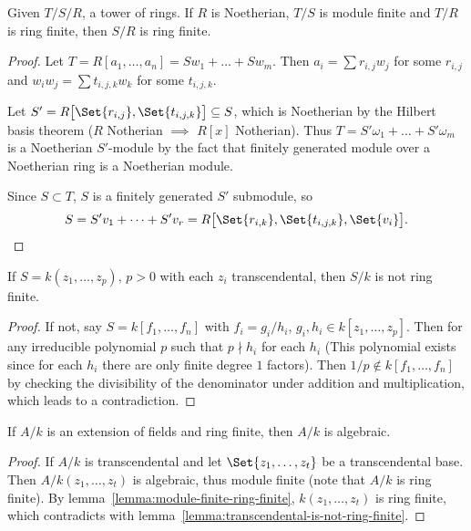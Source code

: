 \begin{lemma} \label{lemma:module-finite-ring-finite}
  Given $T/S/R$, a tower of rings.
  If $R$ is Noetherian, $T/S$ is module finite and $T/R$ is ring finite, then
  $S/R$ is ring finite.

  \begin{proof}
    Let $T = R[a_1, \dots, a_n] = S w_1 + \dots + S w_m$.
    Then $a_i = \sum r_{i, j} w_j$ for some $r_{i, j}$
    and $w_i w_j = \sum t_{i, j, k} w_k$ for some $t_{i, j, k}$.

    Let $S' = R\big[ \Set{r_{i, j}}, \Set{t_{i, j, k}} \big] \subseteq S$, which
    is Noetherian by the Hilbert basis theorem
    ($R$ Notherian $\implies$ $R[x]$ Notherian).
    Thus $T = S' \omega_1 + \dots + S' \omega_m$ is a Noetherian $S'$-module
    by the fact that finitely generated module over a Noetherian ring is a
    Noetherian module.

    Since $S \subset T$, $S$ is a finitely generated $S'$ submodule,
    so
    \[
      S = S' v_1 + \dots + S' v_r = R\big[ \Set{r_{i, k}}, \Set{t_{i, j, k}},
      \Set{v_i} \big].
      \qedhere
    \]
  \end{proof}
\end{lemma}

\begin{lemma} \label{lemma:transcendental-is-not-ring-finite}
    If $S = k(z_1, \dots, z_p), \, p > 0$ with each $z_i$ transcendental,
    then $S/k$ is not ring finite.

  \begin{proof}
    If not, say $S = k[f_1, \dots, f_n]$ with $f_i = g_i / h_i$, $g_i, h_i \in k[z_1, \dots, z_p]$.
    Then for any irreducible polynomial $p$ such that $p \nmid h_i$ for each $h_i$
    (This polynomial exists since for each $h_i$ there are only finite degree $1$ factors).
    Then $1/p \notin k[f_1, \dots, f_n]$ by checking the divisibility of the denominator
    under addition and multiplication, which leads to a contradiction.
  \end{proof}
\end{lemma}

\begin{lemma} \label{lemma:ring-finite-is-alg}
  If $A/k$ is an extension of fields and ring finite, then $A/k$ is algebraic.

  \begin{proof}
    If $A/k$ is transcendental and let $\Set{z_1, \dots, z_t}$ be a transcendental base.
    Then $A/k(z_1, \dots, z_t)$ is algebraic, thus module finite
    (note that $A/k$ is ring finite).
    By lemma~\ref{lemma:module-finite-ring-finite}, $k(z_1, \dots, z_t)$ is ring finite,
    which contradicts with lemma~\ref{lemma:transcendental-is-not-ring-finite}.
  \end{proof}
\end{lemma}

